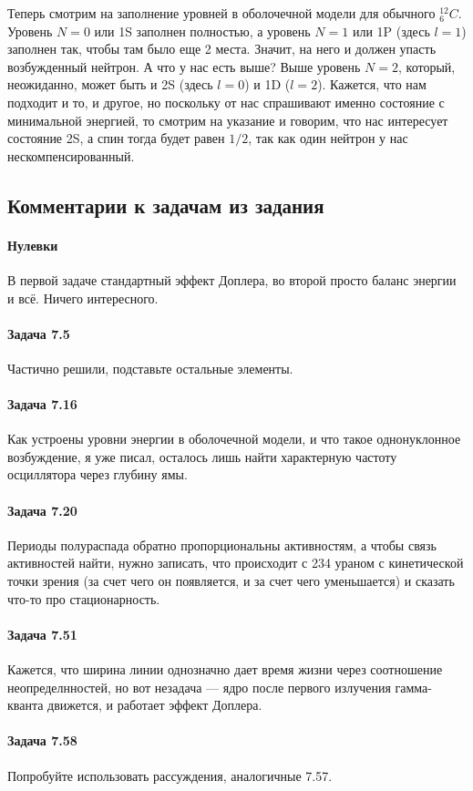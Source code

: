 \documentclass[12pt]{article}
\begin{document}
Теперь смотрим на заполнение уровней в оболочечной модели для обычного ${}^{12}_6C$. Уровень $N=0$ или 1S заполнен полностью, а уровень $N=1$ или 1P (здесь $l=1$) заполнен так, чтобы там было еще 2 места. Значит, на него и должен упасть возбужденный нейтрон. А что у нас есть выше? Выше уровень $N=2$, который, неожиданно, может быть и 2S (здесь $l=0$) и 1D ($l=2$). Кажется, что нам подходит и то, и другое, но поскольку от нас спрашивают именно состояние с минимальной энергией, то смотрим на указание и говорим, что нас интересует состояние 2S, а спин тогда будет равен $1/2$, так как один нейтрон у нас нескомпенсированный.


\subsection{Комментарии к задачам из задания}
\paragraph{Нулевки} В первой задаче стандартный эффект Доплера, во второй просто баланс энергии и всё. Ничего интересного.
\paragraph{Задача 7.5} Частично решили, подставьте остальные элементы.
\paragraph{Задача 7.16} Как устроены уровни энергии в оболочечной модели, и что такое однонуклонное возбуждение, я уже писал, осталось лишь найти характерную частоту осциллятора через глубину ямы.
\paragraph{Задача 7.20} Периоды полураспада обратно пропорциональны активностям, а чтобы связь активностей найти, нужно записать, что происходит с 234 ураном с кинетической точки зрения (за счет чего он появляется, и за счет чего уменьшается) и сказать что-то про стационарность.
\paragraph{Задача 7.51} Кажется, что ширина линии однозначно дает время жизни через соотношение неопределнностей, но вот незадача --- ядро после первого излучения гамма-кванта движется, и работает эффект Доплера.
\paragraph{Задача 7.58} Попробуйте использовать рассуждения, аналогичные 7.57.
\end{document}
